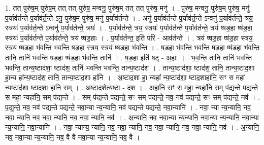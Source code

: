 \documentclass[17pt]{extarticle}
\begin{document}
1. तत् पुरु॑ष॒म् पुरु॑ष॒म् तत् तत् पुरु॑ष॒ मन्वनु॒ पुरु॑ष॒म् तत् तत् पुरु॑ष॒ मनु॑ । . पुरु॑ष॒ मन्वनु॒ पुरु॑ष॒म् पुरु॑ष॒ मनु॑ प॒र्याव॑र्तन्ते प॒र्याव॑र्त॒न्ते ऽनु॒ पुरु॑ष॒म् पुरु॑ष॒ मनु॑ प॒र्याव॑र्तन्ते । . अनु॑ प॒र्याव॑र्तन्ते प॒र्याव॑र्त॒न्ते ऽन्वनु॑ प॒र्याव॑र्तन्ते॒ त्रय॒ स्त्रयः॑ प॒र्याव॑र्त॒न्ते ऽन्वनु॑ प॒र्याव॑र्तन्ते॒ त्रयः॑ । . प॒र्याव॑र्तन्ते॒ त्रय॒ स्त्रयः॑ प॒र्याव॑र्तन्ते प॒र्याव॑र्तन्ते॒ त्रय॑ ष्षड॒हा ष्ष॑ड॒हा स्त्रयः॑ प॒र्याव॑र्तन्ते प॒र्याव॑र्तन्ते॒ त्रय॑ ष्षड॒हाः । . प॒र्याव॑र्तन्त॒ इति॑ परि - आव॑र्तन्ते । . त्रय॑ ष्षड॒हा ष्ष॑ड॒हा स्त्रय॒ स्त्रय॑ ष्षड॒हा भ॑वन्ति भवन्ति षड॒हा स्त्रय॒ स्त्रय॑ ष्षड॒हा भ॑वन्ति । . ष॒ड॒हा भ॑वन्ति भवन्ति षड॒हा ष्ष॑ड॒हा भ॑वन्ति॒ तानि॒ तानि॑ भवन्ति षड॒हा ष्ष॑ड॒हा भ॑वन्ति॒ तानि॑ । . ष॒ड॒हा इति॑ षट् - अ॒हाः । . भ॒व॒न्ति॒ तानि॒ तानि॑ भवन्ति भवन्ति॒ तान्य॒ष्टाद॑शा॒ ष्टाद॑श॒ तानि॑ भवन्ति भवन्ति॒ तान्य॒ष्टाद॑श । . तान्य॒ष्टाद॑शा॒ ष्टाद॑श॒ तानि॒ तान्य॒ष्टाद॒शा हा॒न्य हा᳚न्य॒ष्टाद॑श॒ तानि॒ तान्य॒ष्टाद॒शा हा॑नि । . अ॒ष्टाद॒शा हा॒ न्यहा᳚ न्य॒ष्टाद॑शा॒ ष्टाद॒शाहा॑नि॒ सꣳ स महा᳚ न्य॒ष्टाद॑शा॒ ष्टाद॒शा हा॑नि॒ सम् । . अ॒ष्टाद॒शेत्य॒ष्टा - द॒श॒ । . अहा॑नि॒ सꣳ स महा॒ न्यहा॑नि॒ सम् प॑द्यन्ते पद्यन्ते॒ स महा॒ न्यहा॑नि॒ सम् प॑द्यन्ते । . सम् प॑द्यन्ते पद्यन्ते॒ सꣳ सम् प॑द्यन्ते॒ नव॒ नव॑ पद्यन्ते॒ सꣳ सम् प॑द्यन्ते॒ नव॑ । . प॒द्य॒न्ते॒ नव॒ नव॑ पद्यन्ते पद्यन्ते॒ नवा॒न्या न्य॒न्यानि॒ नव॑ पद्यन्ते पद्यन्ते॒ नवा॒न्यानि॑ । . नवा॒ न्या न्य॒न्यानि॒ नव॒ नवा॒ न्यानि॒ नव॒ नवा॒ न्यानि॒ नव॒ नवा॒ न्यानि॒ नव॑ । . अ॒न्यानि॒ नव॒ नवा॒न्या न्य॒न्यानि॒ नवा॒न्या न्य॒न्यानि॒ नवा॒न्या न्य॒न्यानि॒ नवा॒न्यानि॑ । . नवा॒ न्यान्य॒ न्यानि॒ नव॒ नवा॒ न्यानि॒ नव॒ नवा॒ न्यानि॒ नव॒ नवा॒ न्यानि॒ नव॑ । . अ॒न्यानि॒ नव॒ नवा॒न्या न्य॒न्यानि॒ नव॒ वै वै नवा॒न्या न्य॒न्यानि॒ नव॒ वै । \newline
\end{document}
